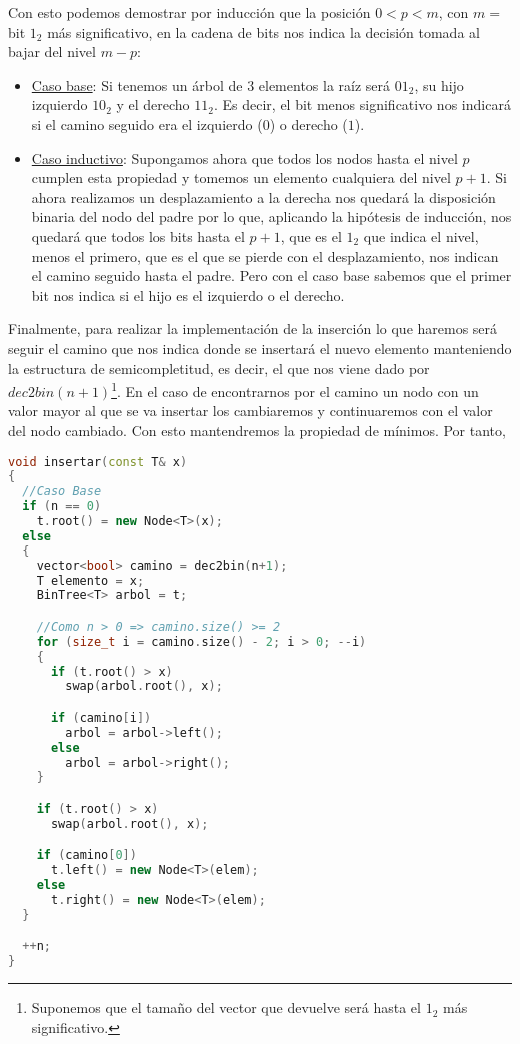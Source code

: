 \documentclass[10pt,a4paper,openright]{book}
\theoremstyle{break}
\begin{document}
Con esto podemos demostrar por inducción que la posición $0 < p < m$, con $m = $ bit $1_2$ más significativo, en la cadena de bits nos indica la decisión tomada al bajar del nivel $m - p$:
\begin{itemize}
    \item \underline{Caso base}: Si tenemos un árbol de $3$ elementos la raíz será $01_2$, su hijo izquierdo $10_2$ y el derecho $11_2$. Es decir, el bit menos significativo nos indicará si el camino seguido era el izquierdo ($0$) o derecho ($1$).
    \item \underline{Caso inductivo}: Supongamos ahora que todos los nodos hasta el nivel $p$ cumplen esta propiedad y tomemos un elemento cualquiera del nivel $p + 1$. Si ahora realizamos un desplazamiento a la derecha nos quedará la disposición binaria del nodo del padre por lo que, aplicando la hipótesis de inducción, nos quedará que todos los bits hasta el $p + 1$, que es el $1_2$ que indica el nivel, menos el primero, que es el que se pierde con el desplazamiento, nos indican el camino seguido hasta el padre. Pero
        con el caso base sabemos que el primer bit nos indica si el hijo es el izquierdo o el derecho.
\end{itemize}

Finalmente, para realizar la implementación de la inserción lo que haremos será seguir el camino que nos indica donde se insertará el nuevo elemento manteniendo la estructura de semicompletitud, es decir, el que nos viene dado por $dec2bin(n+1)$\footnote{Suponemos que el tamaño del vector que devuelve será hasta el $1_2$ más significativo.}. 
En el caso de encontrarnos por el camino un nodo con un valor mayor al que se va insertar los cambiaremos y continuaremos con el valor del nodo cambiado. Con esto mantendremos la propiedad de mínimos. Por tanto,

\begin{minipage}{\linewidth}
\begin{lstlisting}[language=c++]
void insertar(const T& x)
{
  //Caso Base
  if (n == 0) 
    t.root() = new Node<T>(x); 
  else 
  {
    vector<bool> camino = dec2bin(n+1); 
    T elemento = x;
    BinTree<T> arbol = t;

    //Como n > 0 => camino.size() >= 2
    for (size_t i = camino.size() - 2; i > 0; --i)
    { 
      if (t.root() > x) 
        swap(arbol.root(), x);

      if (camino[i])
        arbol = arbol->left();
      else 
        arbol = arbol->right();
    }

    if (t.root() > x) 
      swap(arbol.root(), x);

    if (camino[0])
      t.left() = new Node<T>(elem);
    else 
      t.right() = new Node<T>(elem);
  }

  ++n;
}
\end{lstlisting}    
\end{minipage}
\end{document}
